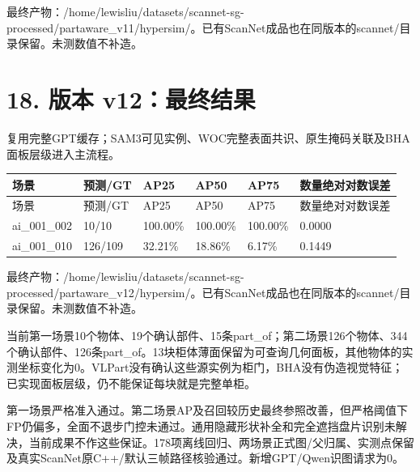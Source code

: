 \documentclass[UTF8,fontset=fandol]{ctexart}
\begin{document}
最终产物：/home/lewisliu/datasets/scannet-sg-processed/partaware\_v11/hypersim/。已有ScanNet成品也在同版本的scannet/目录保留。未测数值不补造。



\section*{18. 版本 v12：最终结果}

复用完整GPT缓存；SAM3可见实例、WOC完整表面共识、原生掩码关联及BHA面板层级进入主流程。



{\small
\begin{longtable}{|p{}|p{}|p{}|p{}|p{}|p{}|}
\hline
场景 & 预测/GT & AP25 & AP50 & AP75 & 数量绝对对数误差 \\ \hline
\endfirsthead
\hline
场景 & 预测/GT & AP25 & AP50 & AP75 & 数量绝对对数误差 \\ \hline
\endhead
ai\_001\_002 & 10/10 & 100.00\% & 100.00\% & 100.00\% & 0.0000 \\ \hline
ai\_001\_010 & 126/109 & 32.21\% & 18.86\% & 6.17\% & 0.1449 \\ \hline
\end{longtable}
}

最终产物：/home/lewisliu/datasets/scannet-sg-processed/partaware\_v12/hypersim/。已有ScanNet成品也在同版本的scannet/目录保留。未测数值不补造。



当前第一场景10个物体、19个确认部件、15条part\_of；第二场景126个物体、344个确认部件、126条part\_of。13块柜体薄面保留为可查询几何面板，其他物体的实测坐标变化为0。VLPart没有确认这些源实例为柜门，BHA没有伪造视觉特征；已实现面板层级，仍不能保证每块就是完整单柜。



第一场景严格准入通过。第二场景AP及召回较历史最终参照改善，但严格阈值下FP仍偏多，全面不退步门控未通过。通用隐藏形状补全和完全遮挡盘片识别未解决，当前成果不作这些保证。178项离线回归、两场景正式图/父归属、实测点保留及真实ScanNet原C++/默认三帧路径核验通过。新增GPT/Qwen识图请求为0。
\end{document}
